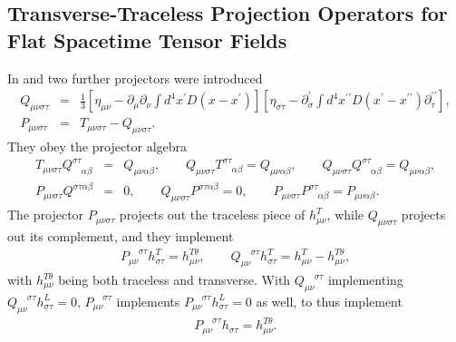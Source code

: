 \documentclass[aps,onecolumn,10pt]{revtex4}
\numberwithin{equation}{section}
\numberwithin{equation}{section}
\begin{document}
\subsection{Transverse-Traceless Projection Operators for Flat Spacetime Tensor Fields}


In \cite{Mannheim2005} and \cite{Amarasinghe2018} two further projectors were introduced
%
\begin{eqnarray}
Q_{\mu\nu\sigma\tau}&=&\frac{1}{3}\left[\eta_{\mu\nu}
-\partial_{\mu}\partial_{\nu}\int d^4x^{\prime}D(x-x^{\prime})\right]
\left[\eta_{\sigma\tau}-\partial^{\prime}_{\sigma}\int
d^4x^{\prime\prime}D(x^{\prime}-x^{\prime\prime})\partial^{\prime\prime}_{\tau}\right],
\nonumber\\
P_{\mu\nu\sigma\tau}&=&T_{\mu\nu\sigma\tau}-Q_{\mu\nu\sigma\tau}.
\label{A.18a}
\end{eqnarray}
%  
They obey the projector algebra
%
\begin{eqnarray}
T_{\mu\nu\sigma\tau}Q^{\sigma\tau}_{\phantom{\sigma\tau}\alpha\beta}
&=&Q_{\mu\nu\alpha\beta},\qquad
Q_{\mu\nu\sigma\tau}T^{\sigma\tau}_{\phantom{\sigma\tau}\alpha\beta}
=Q_{\mu\nu\alpha\beta},\qquad
Q_{\mu\nu\sigma\tau}Q^{\sigma\tau}_{\phantom{\sigma\tau}\alpha\beta}
=Q_{\mu\nu\alpha\beta}, 
\nonumber\\
P_{\mu\nu\sigma\tau}Q^{\sigma\tau\alpha\beta}&=&0,\qquad
Q_{\mu\nu\sigma\tau}P^{\sigma\tau\alpha\beta}=0,\qquad
P_{\mu\nu\sigma\tau}P^{\sigma\tau}_{\phantom{\sigma\tau}\alpha\beta}
=P_{\mu\nu\alpha\beta}.
\label{A.19a}
\end{eqnarray}
%
The projector $P_{\mu\nu\sigma\tau}$ projects out the traceless piece of $h^T_{\mu\nu}$, while $Q_{\mu\nu\sigma\tau}$ projects out its complement, and they implement
%
\begin{eqnarray}
P_{\mu\nu}^{\phantom{\mu\nu}\sigma\tau}h^T_{\sigma\tau}=h^{T\theta}_{\mu\nu},\qquad 
Q_{\mu\nu}^{\phantom{\mu\nu}\sigma\tau}h^T_{\sigma\tau}
=h^T_{\mu\nu}-h^{T\theta}_{\mu\nu},
\label{A.20a}
\end{eqnarray}
% 
with $h^{T\theta}_{\mu\nu}$ being both traceless and transverse. With $Q_{\mu\nu}^{\phantom{\mu\nu}\sigma\tau}$ implementing $Q_{\mu\nu}^{\phantom{\mu\nu}\sigma\tau}h^L_{\sigma\tau}=0$, $P_{\mu\nu}^{\phantom{\mu\nu}\sigma\tau}$ implements $P_{\mu\nu}^{\phantom{\mu\nu}\sigma\tau}h^L_{\sigma\tau}=0$ as well, to thus implement 
%
\begin{eqnarray}
 P_{\mu\nu}^{\phantom{\mu\nu}\sigma\tau}h_{\sigma\tau}=h^{T\theta}_{\mu\nu}.
\label{A.21a}
\end{eqnarray}
\end{document}
